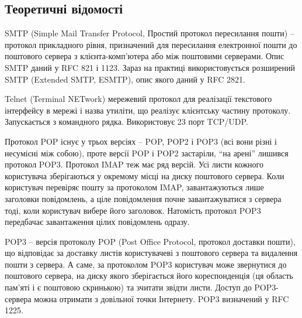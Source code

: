 \documentclass{article}
\begin{document}
\begin{normalsize}
\section*{Теоретичні відомості}
SMTP (Simple Mail Transfer Protocol, Простий протокол пересилання пошти) – протокол прикладного рівня, призначений для пересилання електронної пошти до поштового сервера з клієнта-комп’ютера або між поштовими серверами. Опис SMTP даний у RFC 821 і 1123. Зараз на практиці використовується розширений SMTP (Extended SMTP, ESMTP), опис якого даний у RFC 2821.

Telnet (Terminal NETwork) мережевий протокол для реалізації текстового інтерфейсу в мережі і назва утиліти, що реалізує клієнтську частину протоколу. Запускається з командного рядка. Використовує 23 порт TCP/UDP.

Протокол POP існує у трьох версіях – POP, POP2 і POP3 (всі вони різні і несумісні між собою), проте версії POP і POP2 застаріли, “на арені” лишився протокол POP3. Протокол IMAP теж має ряд версій. Усі листи кожного користувача зберігаються у окремому місці на диску поштового сервера. Коли користувач перевіряє пошту за протоколом IMAP, завантажуються лише заголовки повідомлень, а ціле повідомлення почне завантажуватися з сервера тоді, коли користувач вибере його заголовок. Натомість протокол POP3 передбачає завантаження цілих повідомлень одразу. 

POP3 – версія протоколу POP (Post Office Protocol, протокол доставки пошти), що відповідає за доставку листів користувачеві з поштового сервера та видалення пошти з сервера. А саме, за протоколом POP3 користувач може звернутися до поштового сервера, на диску якого зберігається його кореспонденція (ця область пам’яті і є поштовою скринькою) та зчитати звідти листи. Доступ до POP3-сервера можна отримати з довільної точки Інтернету. POP3 визначений у RFC 1225.



\end{normalsize}
\end{document}
